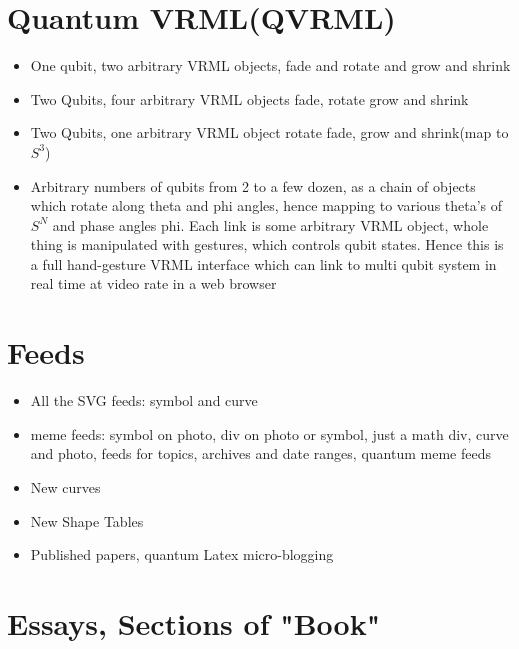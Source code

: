\documentclass[11pt]{article}
\begin{document}
\section{
Quantum VRML(QVRML)}
\begin{itemize}

    \item
One qubit, two arbitrary VRML objects, fade and rotate and grow and shrink
    \item
Two Qubits, four arbitrary VRML objects fade, rotate grow and shrink
    \item
Two Qubits, one arbitrary VRML object rotate fade, grow and shrink(map to $S^3$)
    \item
Arbitrary numbers of qubits from 2 to a few dozen, as a chain of objects which rotate along theta and phi angles, hence mapping to various theta's of $S^N$ and phase angles phi.  Each link is some arbitrary VRML object, whole thing is manipulated with gestures, which controls qubit states.  Hence this is a full hand-gesture VRML interface which can link to multi qubit system in real time at video rate in a web browser
\end{itemize}


\section{
Feeds}
\begin{itemize}

    \item
All the SVG feeds: symbol and curve
    \item
meme feeds: symbol on photo, div on photo or symbol, just a math div, curve and photo, feeds for topics, archives and date ranges, quantum meme feeds
    \item
New curves
    \item
New Shape Tables
    \item
Published papers, quantum Latex micro-blogging
\end{itemize}


\section{
Essays, Sections of "Book"}
\end{document}
